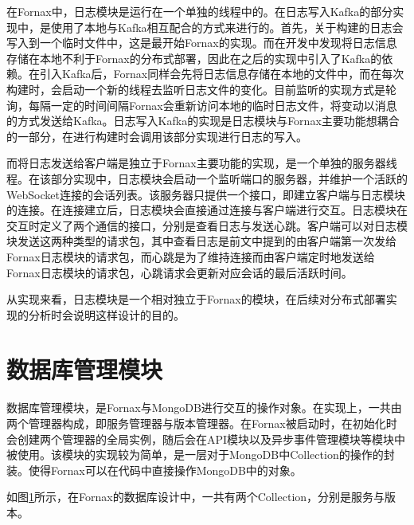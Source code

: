 在Fornax中，日志模块是运行在一个单独的线程中的。在日志写入Kafka的部分实现中，是使用了本地与Kafka相互配合的方式来进行的。首先，关于构建的日志会写入到一个临时文件中，这是最开始Fornax的实现。而在开发中发现将日志信息存储在本地不利于Fornax的分布式部署，因此在之后的实现中引入了Kafka的依赖。在引入Kafka后，Fornax同样会先将日志信息存储在本地的文件中，而在每次构建时，会启动一个新的线程去监听日志文件的变化。目前监听的实现方式是轮询，每隔一定的时间间隔Fornax会重新访问本地的临时日志文件，将变动以消息的方式发送给Kafka。日志写入Kafka的实现是日志模块与Fornax主要功能想耦合的一部分，在进行构建时会调用该部分实现进行日志的写入。

而将日志发送给客户端是独立于Fornax主要功能的实现，是一个单独的服务器线程。在该部分实现中，日志模块会启动一个监听端口的服务器，并维护一个活跃的WebSocket连接的会话列表。该服务器只提供一个接口，即建立客户端与日志模块的连接。在连接建立后，日志模块会直接通过连接与客户端进行交互。日志模块在交互时定义了两个通信的接口，分别是查看日志与发送心跳。客户端可以对日志模块发送这两种类型的请求包，其中查看日志是前文中提到的由客户端第一次发给Fornax日志模块的请求包，而心跳是为了维持连接而由客户端定时地发送给Fornax日志模块的请求包，心跳请求会更新对应会话的最后活跃时间。

从实现来看，日志模块是一个相对独立于Fornax的模块，在后续对分布式部署实现的分析时会说明这样设计的目的。

\section{数据库管理模块}

数据库管理模块，是Fornax与MongoDB进行交互的操作对象。在实现上，一共由两个管理器构成，即服务管理器与版本管理器。在Fornax被启动时，在初始化时会创建两个管理器的全局实例，随后会在API模块以及异步事件管理模块等模块中被使用。该模块的实现较为简单，是一层对于MongoDB中Collection的操作的封装。使得Fornax可以在代码中直接操作MongoDB中的对象。

如图\ref{}所示，在Fornax的数据库设计中，一共有两个Collection，分别是服务与版本。